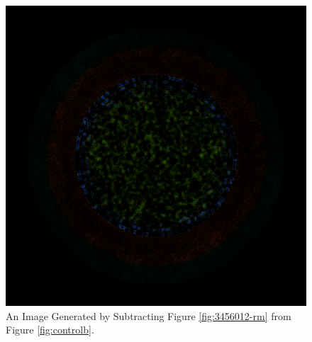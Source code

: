 \begin{figure}[H]
\centering
\includegraphics[width=0.6\linewidth]{figures/shuffle/diff-3456012}
\caption{An Image Generated by Subtracting Figure \ref{fig:3456012-rm} from Figure \ref{fig:controlb}.}
\label{fig:diff-3456012}
\end{figure}